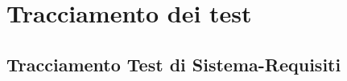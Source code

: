 \documentclass[../PianoDiQualifica.tex]{subfiles}
\begin{document}
\section{Tracciamento dei test}



	\subsection{Tracciamento Test di Sistema-Requisiti}
\end{document}
